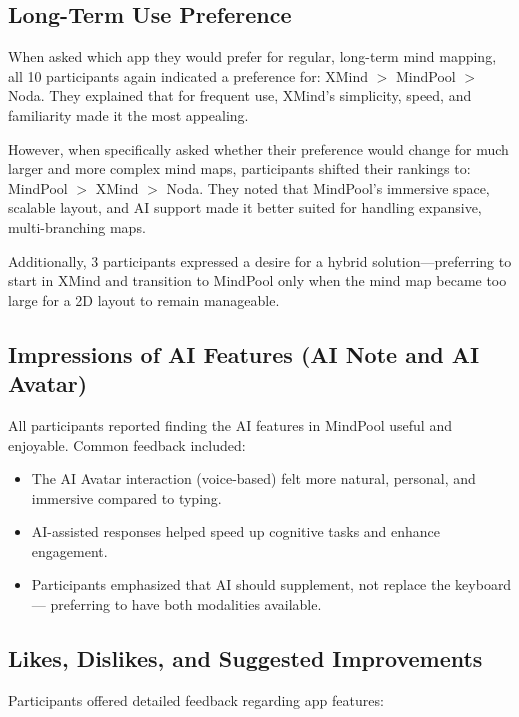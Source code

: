 \documentclass{CPP}
\begin{document}
\subsection{Long-Term Use Preference}

When asked which app they would prefer for regular, long-term mind mapping, all 10 participants again indicated a preference for:
XMind $>$ MindPool $>$ Noda.
They explained that for frequent use, XMind’s simplicity, speed, and familiarity made it the most appealing.

However, when specifically asked whether their preference would change for much larger and more complex mind maps, participants shifted their rankings to:
MindPool $>$ XMind $>$ Noda.
They noted that MindPool’s immersive space, scalable layout, and AI support made it better suited for handling expansive, multi-branching maps.

Additionally, 3 participants expressed a desire for a hybrid solution—preferring to start in XMind and transition to MindPool only when the mind map became too large for a 2D layout to remain manageable.


\subsection{Impressions of AI Features (AI Note and AI Avatar)}
All participants reported finding the AI features in MindPool useful and enjoyable. Common feedback included:
\begin{itemize}
    \item The AI Avatar interaction (voice-based) felt more natural, personal, and immersive compared to typing.
    \item AI-assisted responses helped speed up cognitive tasks and enhance engagement.
    \item Participants emphasized that AI should supplement, not replace the keyboard — preferring to have both modalities available.
\end{itemize}
\subsection{Likes, Dislikes, and Suggested Improvements}
Participants offered detailed feedback regarding app features:
\end{document}
